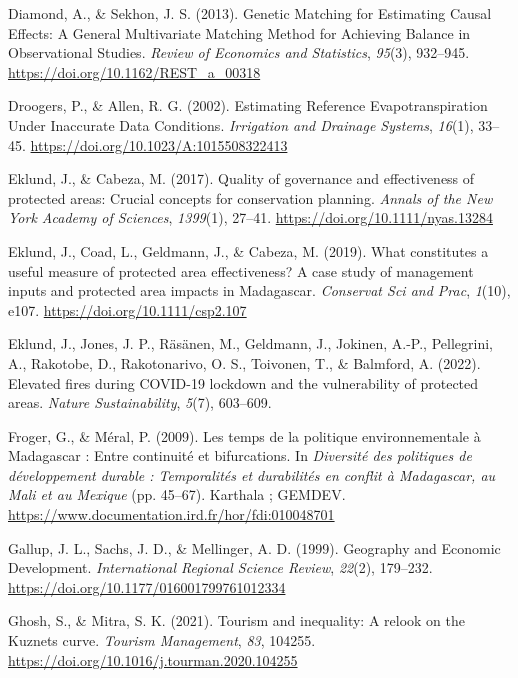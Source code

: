 \documentclass[
]{article}
\newlength{\cslhangindent}
\newenvironment{CSLReferences}[2] %
 {\begin{list}{}{%
  \setlength{\itemindent}{0pt}
  \setlength{\leftmargin}{0pt}
  \setlength{\parsep}{0pt}
  \ifodd #1
   \setlength{\leftmargin}{\cslhangindent}
   \setlength{\itemindent}{-1\cslhangindent}
  \fi
  \setlength{\itemsep}{#2\baselineskip}}}
 {\end{list}}
\begin{document}
\begin{CSLReferences}{1}{0}
Diamond, A., \& Sekhon, J. S. (2013). Genetic {Matching} for
{Estimating} {Causal} {Effects}: {A} {General} {Multivariate} {Matching}
{Method} for {Achieving} {Balance} in {Observational} {Studies}.
\emph{Review of Economics and Statistics}, \emph{95}(3), 932--945.
\url{https://doi.org/10.1162/REST_a_00318}

Droogers, P., \& Allen, R. G. (2002). Estimating {Reference}
{Evapotranspiration} {Under} {Inaccurate} {Data} {Conditions}.
\emph{Irrigation and Drainage Systems}, \emph{16}(1), 33--45.
\url{https://doi.org/10.1023/A:1015508322413}

Eklund, J., \& Cabeza, M. (2017). Quality of governance and
effectiveness of protected areas: Crucial concepts for conservation
planning. \emph{Annals of the New York Academy of Sciences},
\emph{1399}(1), 27--41. \url{https://doi.org/10.1111/nyas.13284}

Eklund, J., Coad, L., Geldmann, J., \& Cabeza, M. (2019). What
constitutes a useful measure of protected area effectiveness? {A} case
study of management inputs and protected area impacts in {Madagascar}.
\emph{Conservat Sci and Prac}, \emph{1}(10), e107.
\url{https://doi.org/10.1111/csp2.107}

Eklund, J., Jones, J. P., Räsänen, M., Geldmann, J., Jokinen, A.-P.,
Pellegrini, A., Rakotobe, D., Rakotonarivo, O. S., Toivonen, T., \&
Balmford, A. (2022). Elevated fires during {COVID}-19 lockdown and the
vulnerability of protected areas. \emph{Nature Sustainability},
\emph{5}(7), 603--609.

Froger, G., \& Méral, P. (2009). Les temps de la politique
environnementale à {Madagascar} : Entre continuité et bifurcations. In
\emph{Diversité des politiques de développement durable : Temporalités
et durabilités en conflit à {Madagascar}, au {Mali} et au {Mexique}}
(pp. 45--67). Karthala ; GEMDEV.
\url{https://www.documentation.ird.fr/hor/fdi:010048701}

Gallup, J. L., Sachs, J. D., \& Mellinger, A. D. (1999). Geography and
{Economic} {Development}. \emph{International Regional Science Review},
\emph{22}(2), 179--232. \url{https://doi.org/10.1177/016001799761012334}

Ghosh, S., \& Mitra, S. K. (2021). Tourism and inequality: {A} relook on
the {Kuznets} curve. \emph{Tourism Management}, \emph{83}, 104255.
\url{https://doi.org/10.1016/j.tourman.2020.104255}


\end{CSLReferences}
\end{document}

